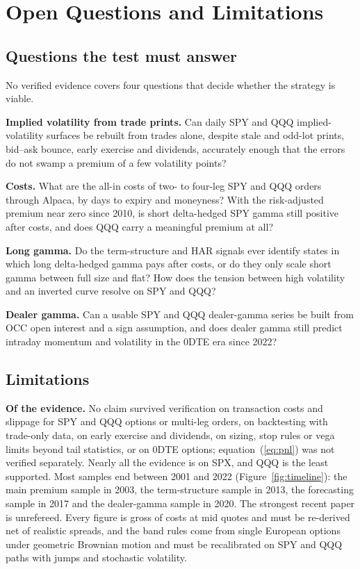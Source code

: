 \documentclass[10pt, a4paper, twocolumn]{article}
\begin{document}
\section{Open Questions and Limitations}
\label{sec:open}

\subsection{Questions the test must answer}

No verified evidence covers four questions that decide whether the strategy is viable.

\textbf{Implied volatility from trade prints.} Can daily SPY and QQQ implied-volatility surfaces be rebuilt from trades alone, despite stale and odd-lot prints, bid--ask bounce, early exercise and dividends, accurately enough that the errors do not swamp a premium of a few volatility points?

\textbf{Costs.} What are the all-in costs of two- to four-leg SPY and QQQ orders through Alpaca, by days to expiry and moneyness? With the risk-adjusted premium near zero since 2010, is short delta-hedged SPY gamma still positive after costs, and does QQQ carry a meaningful premium at all?

\textbf{Long gamma.} Do the term-structure and HAR signals ever identify states in which long delta-hedged gamma pays after costs, or do they only scale short gamma between full size and flat? How does the tension between high volatility and an inverted curve resolve on SPY and QQQ?

\textbf{Dealer gamma.} Can a usable SPY and QQQ dealer-gamma series be built from OCC open interest and a sign assumption, and does dealer gamma still predict intraday momentum and volatility in the 0DTE era since 2022?

\subsection{Limitations}

\textbf{Of the evidence.} No claim survived verification on transaction costs and slippage for SPY and QQQ options or multi-leg orders, on backtesting with trade-only data, on early exercise and dividends, on sizing, stop rules or vega limits beyond tail statistics, or on 0DTE options; equation~(\ref{eq:pnl}) was not verified separately. Nearly all the evidence is on SPX, and QQQ is the least supported. Most samples end between 2001 and 2022 (Figure~\ref{fig:timeline}): the main premium sample in 2003, the term-structure sample in 2013, the forecasting sample in 2017 and the dealer-gamma sample in 2020. The strongest recent paper is unrefereed. Every figure is gross of costs at mid quotes and must be re-derived net of realistic spreads, and the band rules come from single European options under geometric Brownian motion and must be recalibrated on SPY and QQQ paths with jumps and stochastic volatility.
\end{document}

